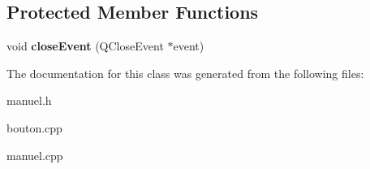 \subsection*{Protected Member Functions}
\begin{DoxyCompactItemize}
\item 
\hypertarget{classmanuel_a3d72b69379f3e8cac58912b53bb0ddec}{}void {\bfseries close\+Event} (Q\+Close\+Event $\ast$event)\label{classmanuel_a3d72b69379f3e8cac58912b53bb0ddec}

\end{DoxyCompactItemize}


The documentation for this class was generated from the following files\+:\begin{DoxyCompactItemize}
\item 
manuel.\+h\item 
bouton.\+cpp\item 
manuel.\+cpp\end{DoxyCompactItemize}
